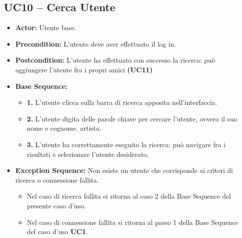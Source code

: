 \subsection{UC10 -- Cerca Utente}
\begin{itemize}
    \item \textbf{Actor:} Utente base.
    \item \textbf{Precondition:} L'utente deve aver effettuato il log in.
    \item \textbf{Postcondition:} L'utente ha effettuato con successo la ricerca: può aggiungere l'utente fra i propri amici \textbf{(UC11)}
    \item \textbf{Base Sequence:}
    \begin{itemize}
        \item \textbf{1.} L'utente clicca sulla barra di ricerca apposita nell'interfaccia.
        \item \textbf{2.} L'utente digita delle parole chiave per cercare l'utente, ovvero il suo nome e cognome.
        artista.
        \item \textbf{3.} L'utente ha correttamente eseguito la ricerca: può navigare fra i risultati e selezionare l'utente desiderato.
    \end{itemize}
    \item \textbf{Exception Sequence:} Non esiste un utente che corrisponde ai criteri di ricerca o connessione fallita.
    \begin{itemize}
        \item Nel caso di ricerca fallita si ritorna al caso 2 della Base Sequence del presente caso d'uso.
        \item Nel caso di connessione fallita si ritorna al passo 1 della Base Sequence del caso d'uso \textbf{UC1}.
    \end{itemize}
\end{itemize}
\vspace{1cm}

